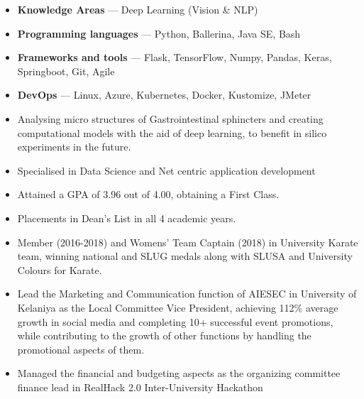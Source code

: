 \documentclass[10pt,a4paper,ragged2e,withhyper]{altacv}
\begin{document}

\begin{itemize}
    \item \textbf{Knowledge Areas } --- Deep Learning (Vision \& NLP)
    \item \textbf{Programming languages} --- Python, Ballerina, Java SE, Bash
    \item \textbf{Frameworks and tools} --- Flask, TensorFlow, Numpy, Pandas, Keras, Springboot, Git, Agile
    \item \textbf{DevOps} --- Linux, Azure, Kubernetes, Docker, Kustomize, JMeter
\end{itemize}

\pagebreak



\begin{itemize}
    \item Analysing micro structures of Gastrointestinal sphincters and creating computational models with the aid of deep learning, to benefit in silico experiments in the future.
\end{itemize}

\divider{}

\begin{itemize}
    \item Specialised in Data Science and Net centric application development
    \item Attained a GPA of 3.96 out of 4.00, obtaining a First Class.
    \item Placements in Dean’s List in all 4 academic years.
    \item Member (2016-2018) and Womens' Team Captain (2018) in University Karate team, winning national and SLUG medals along with SLUSA and University Colours for Karate. 
    \item Lead the Marketing and Communication function of AIESEC in University of Kelaniya as the Local Committee Vice President, achieving 112\% average growth in social media and completing 10+ successful event promotions, while contributing to the growth of other functions by handling the promotional aspects of them.
    \item Managed the financial and budgeting aspects as the organizing committee finance lead in RealHack 2.0 Inter-University Hackathon 
\end{itemize}
\end{document}
